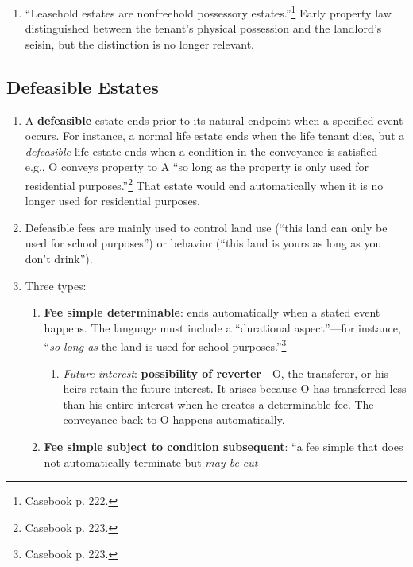\begin{enumerate}
    \item ``Leasehold estates are nonfreehold possessory 
    estates.''\footnote{Casebook p. 222.} Early property law distinguished 
    between the tenant's physical possession and the landlord's seisin, but 
    the distinction is no longer relevant.
\end{enumerate}

\subsection{Defeasible Estates}

\begin{enumerate}
    \item A \textbf{defeasible} estate ends prior to its natural endpoint when 
    a specified event occurs. For instance, a normal life estate ends when the 
    life tenant dies, but a \emph{defeasible} life estate ends when a 
    condition in the conveyance is satisfied---e.g., O conveys property to A 
    ``so long as the property is only used for residential 
    purposes.''\footnote{Casebook p. 223.} That estate would end automatically 
    when it is no longer used for residential purposes.
    \item Defeasible fees are mainly used to control land use (``this land can 
    only be used for school purposes'') or behavior (``this land is yours as 
    long as you don't drink'').
    \item Three types:
    \begin{enumerate}
        \item \textbf{Fee simple determinable}: ends automatically when a 
        stated event happens. The language must include a ``durational 
        aspect''---for instance, ``\emph{so long as} the land is used for 
        school purposes.''\footnote{Casebook p. 223.}
        \begin{enumerate}
            \item \emph{Future interest}: \textbf{possibility of 
            reverter}---O, the transferor, or his heirs retain the future 
            interest. It arises because O has transferred less than his entire 
            interest when he creates a determinable fee. The conveyance back 
            to O happens automatically.
        \end{enumerate}
        \item \textbf{Fee simple subject to condition subsequent}: ``a fee 
        simple that does not automatically terminate but \emph{may be cut 
}
\end{enumerate}
\end{enumerate}
